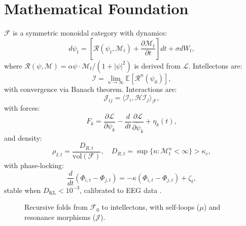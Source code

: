 \documentclass[11pt]{article}
\newcommand{\field}[1]{\mathcal{#1}}
\newcommand{\intellecton}{\mathcal{I}} %
\newcommand{\expect}{\mathbb{E}}
\newcommand{\inner}[2]{\langle #1, #2 \rangle}
\newcommand{\dkl}{D_{\text{KL}}}
\begin{document}
\section{Mathematical Foundation}
\label{sec:math}
$\field{F}$ is a symmetric monoidal category with dynamics:
\begin{equation}
d\psi_t = \left[ \mathcal{R}(\psi_t, \mathcal{M}_t) + \frac{\partial \mathcal{M}_t}{\partial t} \right] dt + \sigma dW_t,
\label{eq:field}
\end{equation}
where $\mathcal{R}(\psi, \mathcal{M}) = \alpha \psi \cdot \mathcal{M}_t / (1 + |\psi|^2)$ is derived from $\mathcal{L}$. Intellectons are:
\begin{equation}
\intellecton = \lim_{n \to \infty} \expect[\mathcal{R}^n(\psi_0)],
\label{eq:intellecton}
\end{equation}
with convergence via Banach theorem. Interactions are:
\begin{equation}
\mathcal{J}_{ij} = \inner{\intellecton_i}{\mathcal{H} \intellecton_j}_{\field{F}},
\label{eq:interaction}
\end{equation}
with forces:
\begin{equation}
F_k = \frac{\partial \mathcal{L}}{\partial \psi_k} - \frac{d}{dt} \frac{\partial \mathcal{L}}{\partial \dot{\psi}_k} + \eta_k(t),
\label{eq:force_field}
\end{equation}
and density:
\begin{equation}
\rho_{I,t} = \frac{D_{R,t}}{\text{vol}(\field{F})}, \quad D_{R,t} = \sup \{ n : \mathcal{M}^n_t < \infty \} > \kappa_c,
\label{eq:density}
\end{equation}
with phase-locking:
\begin{equation}
\frac{d}{dt} (\Phi_{i,t} - \Phi_{j,t}) = -\kappa (\Phi_{i,t} - \Phi_{j,t}) + \zeta_t,
\label{eq:phase}
\end{equation}
stable when $\dkl < 10^{-3}$, calibrated to EEG data \citep{couzin2023}.

\begin{figure}[h]
\centering
{}
\caption{Recursive folds from $\field{F}_0$ to intellectons, with self-loops ($\mu$) and resonance morphisms ($\mathcal{J}$).}
\label{fig:lattice}
\end{figure}
\end{document}
